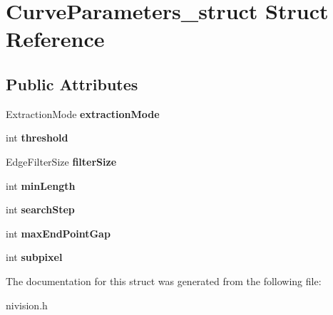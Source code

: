 \hypertarget{structCurveParameters__struct}{
\section{CurveParameters\_\-struct Struct Reference}
\label{structCurveParameters__struct}
}
\subsection*{Public Attributes}
\begin{DoxyCompactItemize}
\item 
\hypertarget{structCurveParameters__struct_a68e4f36477886b8f2ec1dce9ce0d6e89}{
ExtractionMode {\bfseries extractionMode}}
\label{structCurveParameters__struct_a68e4f36477886b8f2ec1dce9ce0d6e89}

\item 
\hypertarget{structCurveParameters__struct_a1a26369bbd59704611fdf586a24f918e}{
int {\bfseries threshold}}
\label{structCurveParameters__struct_a1a26369bbd59704611fdf586a24f918e}

\item 
\hypertarget{structCurveParameters__struct_a570fe9a2b59f298547589fe7a9965075}{
EdgeFilterSize {\bfseries filterSize}}
\label{structCurveParameters__struct_a570fe9a2b59f298547589fe7a9965075}

\item 
\hypertarget{structCurveParameters__struct_a39b758b524a578fe8767de6b6fb8a046}{
int {\bfseries minLength}}
\label{structCurveParameters__struct_a39b758b524a578fe8767de6b6fb8a046}

\item 
\hypertarget{structCurveParameters__struct_a7ac70e92447a37617efb4237aff1c6af}{
int {\bfseries searchStep}}
\label{structCurveParameters__struct_a7ac70e92447a37617efb4237aff1c6af}

\item 
\hypertarget{structCurveParameters__struct_a472a90e1b557ac2ba6c6e3801e81dede}{
int {\bfseries maxEndPointGap}}
\label{structCurveParameters__struct_a472a90e1b557ac2ba6c6e3801e81dede}

\item 
\hypertarget{structCurveParameters__struct_a2d0832ca226f86543fe1419262a3a005}{
int {\bfseries subpixel}}
\label{structCurveParameters__struct_a2d0832ca226f86543fe1419262a3a005}

\end{DoxyCompactItemize}


The documentation for this struct was generated from the following file:\begin{DoxyCompactItemize}
\item 
nivision.h\end{DoxyCompactItemize}
